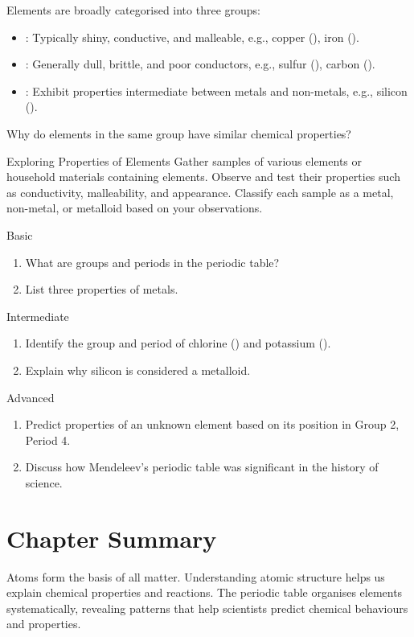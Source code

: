 Elements are broadly categorised into three groups:

\begin{itemize}
	\item {}: Typically shiny, conductive, and malleable, e.g., copper (), iron ().
	\item {}: Generally dull, brittle, and poor conductors, e.g., sulfur (), carbon ().
	\item {}: Exhibit properties intermediate between metals and non-metals, e.g., silicon ().
\end{itemize}

\begin{stopandthink}
Why do elements in the same group have similar chemical properties?
\end{stopandthink}

\begin{investigation}{Exploring Properties of Elements}
Gather samples of various elements or household materials containing elements. Observe and test their properties such as conductivity, malleability, and appearance. Classify each sample as a metal, non-metal, or metalloid based on your observations.
\end{investigation}

\begin{tieredquestions}{Basic}
\begin{enumerate}
	\item What are groups and periods in the periodic table?
	\item List three properties of metals.
\end{enumerate}
\end{tieredquestions}

\begin{tieredquestions}{Intermediate}
\begin{enumerate}
	\item Identify the group and period of chlorine () and potassium ().
	\item Explain why silicon is considered a metalloid.
\end{enumerate}
\end{tieredquestions}

\begin{tieredquestions}{Advanced}
\begin{enumerate}
	\item Predict properties of an unknown element based on its position in Group 2, Period 4.
	\item Discuss how Mendeleev’s periodic table was significant in the history of science.
\end{enumerate}
\end{tieredquestions}

\section{Chapter Summary}
Atoms form the basis of all matter. Understanding atomic structure helps us explain chemical properties and reactions. The periodic table organises elements systematically, revealing patterns that help scientists predict chemical behaviours and properties.